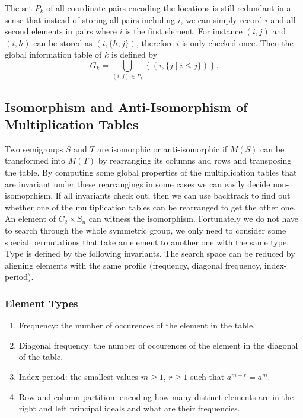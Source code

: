 \documentclass{amsart}
\theoremstyle{plain}
\theoremstyle{definition}
\begin{document}
The set $P_k$ of all coordinate pairs encoding the locations is still redundant in a sense that instead of storing all pairs including $i$, we can simply record $i$ and all second  elements in  pairs where $i$ is the first element.
For instance $(i,j)$ and $(i,h)$ can be stored as $(i,\{h,j\})$, therefore $i$ is only checked once.
Then the  global information table of $k$ is defined by
$$G_k=\bigcup_{(i,j)\in P_k} \left\{ (i,\{j\mid i\leq j\})\right\}.$$

\subsection{Isomorphism and Anti-Isomorphism of Multiplication Tables}
Two semigroups $S$ and $T$ are isomorphic or anti-isomorphic if $M(S)$ can be transformed into $M(T)$ by rearranging its columns and rows and transposing the table.
By computing some global properties of the multiplication tables that are invariant under these rearrangings in some cases we can easily decide non-isomoprhism.
If all invariants check out, then we can use backtrack to find out whether one of the multiplication tables can be rearranged to get the other one.
An element of $C_2\times S_n$ can witness the isomorphism.
Fortunately we do not have to search through the whole symmetric group, we only need to consider some special permutations that take an element to another one with the same type.
Type is defined by the following invariants.
The search space can be reduced by aligning elements with the same profile (frequency, diagonal frequency, index-period).

\subsubsection{Element Types}

\begin{enumerate}
\item Frequency: the number of occurences of the element in the table.
\item Diagonal frequency: the number of occurences of the element in the diagonal of the table.
\item Index-period: the smallest values $m\geq 1$, $r\geq 1$ such that $a^{m+r}=a^m$.
\item Row and column partition: encoding how many distinct elements are in the right and left principal ideals and what are their frequencies.
\end{enumerate} 
\end{document}
